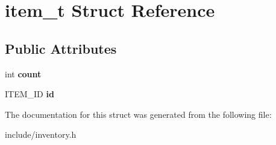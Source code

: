 \hypertarget{structitem__t}{}\section{item\+\_\+t Struct Reference}
\label{structitem__t}
\subsection*{Public Attributes}
\begin{DoxyCompactItemize}
\item 
\hypertarget{structitem__t_a027684448f5b2ab6e00f267e6f9f5fb6}{}int {\bfseries count}\label{structitem__t_a027684448f5b2ab6e00f267e6f9f5fb6}

\item 
\hypertarget{structitem__t_aaa76ee85cd612b5df5f015c3488e99da}{}I\+T\+E\+M\+\_\+\+I\+D {\bfseries id}\label{structitem__t_aaa76ee85cd612b5df5f015c3488e99da}

\end{DoxyCompactItemize}


The documentation for this struct was generated from the following file\+:\begin{DoxyCompactItemize}
\item 
include/inventory.\+h\end{DoxyCompactItemize}
